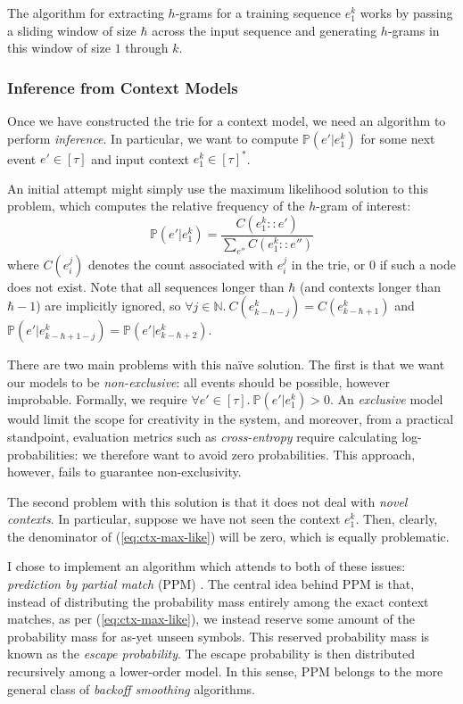 \documentclass[12pt,a4paper,twoside,openright]{report}
\begin{document}
The algorithm for extracting $h$-grams for a training sequence $e_1^k$ works by
passing a sliding window of size $\hbar$ across the input sequence and
generating $h$-grams in this window of size $1$ through $k$. 

\subsubsection{Inference from Context Models}

Once we have constructed the trie for a context model, we need an algorithm to
perform \emph{inference}. In particular, we want to compute $\mathbb{P}(e' |
e_1^k)$ for some next event $e' \in [\tau]$ and input context $e_1^k \in
[\tau]^*$.

An initial attempt might simply use the maximum likelihood solution to this
problem, which computes the relative frequency of the $h$-gram of interest:
\begin{equation}
  \mathbb{P}(e'|e_1^k) = \frac{ C(e_1^k::e') }{ \sum_{e''} C(e_1^k::e'') }
  \label{eq:ctx-max-like}
\end{equation}
where $C(e_i^j)$ denotes the count associated with $e_i^j$ in the trie, or $0$
if such a node does not exist. Note that all sequences longer than $\hbar$ (and
contexts longer than $\hbar-1$) are implicitly ignored, so $\forall j \in
\mathbb{N}.\ C(e_{k-\hbar-j}^k) = C(e_{k-\hbar+1}^k)$ and
$\mathbb{P}(e'|e_{k-\hbar+1-j}^k) = \mathbb{P}(e'|e_{k-\hbar+2}^k)$.

There are two main problems with this naïve solution. The first is that we want
our models to be \emph{non-exclusive}: all events should be possible, however
improbable. Formally, we require $\forall e' \in [\tau].\ \mathbb{P}(e' | e_1^k)
> 0$. An \emph{exclusive} model would limit the scope for creativity in the
system, and moreover, from a practical standpoint, evaluation metrics such as
\emph{cross-entropy} require calculating log-probabilities: we therefore want to
avoid zero probabilities. This approach, however, fails to guarantee
non-exclusivity.

The second problem with this solution is that it does not deal with \emph{novel
contexts}. In particular, suppose we have not seen the context $e_1^k$. Then,
clearly, the denominator of (\ref{eq:ctx-max-like}) will be zero, which is
equally problematic.

I chose to implement an algorithm which attends to both of these issues:
\emph{prediction by partial match} (PPM) \cite{cleary1984ppm}. The central idea
behind PPM is that, instead of distributing the probability mass entirely among
the exact context matches, as per (\ref{eq:ctx-max-like}), we instead reserve
some amount of the probability mass for as-yet unseen symbols. This reserved
probability mass is known as the \emph{escape probability}. The escape
probability is then distributed recursively among a lower-order model. In this
sense, PPM belongs to the more general class of \emph{backoff smoothing}
algorithms.
\end{document}

